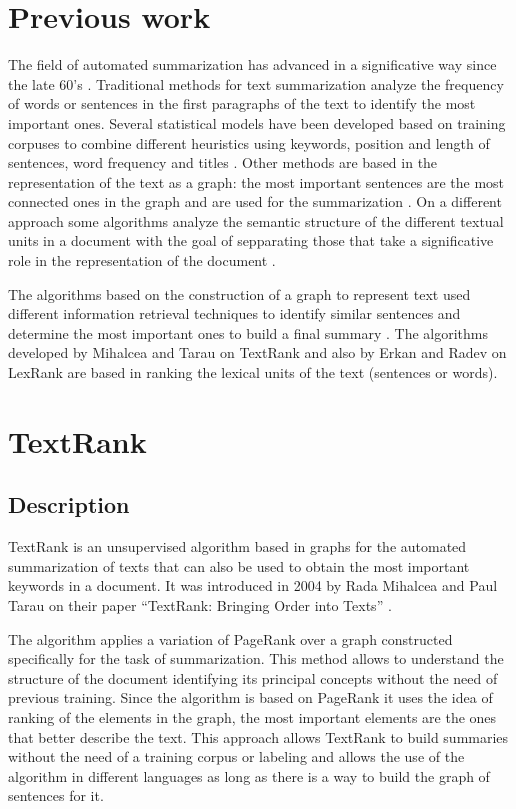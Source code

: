 \documentclass{llncs}
\begin{document}
\section{Previous work}
The field of automated summarization has advanced in a significative way since the late 60's 
\cite{miranda}. Traditional methods for text summarization analyze the frequency of words or sentences in the first paragraphs of the text to identify the most important ones. Several statistical models have been developed based on training corpuses to combine different heuristics using keywords, position and length of sentences, word frequency and titles \cite{hovy}. Other methods are based in the representation of the text as a graph: the most important sentences are the most connected ones in the graph and are used for the summarization \cite{barzilay}. On a different approach some algorithms analyze the semantic structure of the different textual units in a document with the goal of sepparating those that take a significative role in the representation of the document \cite{marcu}.

The algorithms based on the construction of a graph to represent text used different information retrieval techniques to identify similar sentences and determine the most important ones to build a final summary \cite{salton}. The algorithms developed by Mihalcea and Tarau on TextRank \cite{mihalcea-tarau} and also by Erkan and Radev on LexRank \cite{erkan} are based in ranking the lexical units of the text (sentences or words).

\section{TextRank}

\subsection{Description}
TextRank is an unsupervised algorithm based in graphs for the automated summarization of texts that can also be used to obtain the most important keywords in a document. It was introduced in 2004 by Rada Mihalcea and Paul Tarau on their paper “TextRank: Bringing Order into Texts” \cite{mihalcea-tarau}.

The algorithm applies a variation of PageRank \cite{pageetal98} over a graph constructed specifically for the task of summarization. This method allows to understand the structure of the document identifying its principal concepts without the need of previous training. Since the algorithm is based on PageRank it uses the idea of ranking of the elements in the graph, the most important elements are the ones that better describe the text. This approach allows TextRank to build summaries without the need of a training corpus or labeling and allows the use of the algorithm in different languages as long as there is a way to build the graph of sentences for it.
\end{document}
